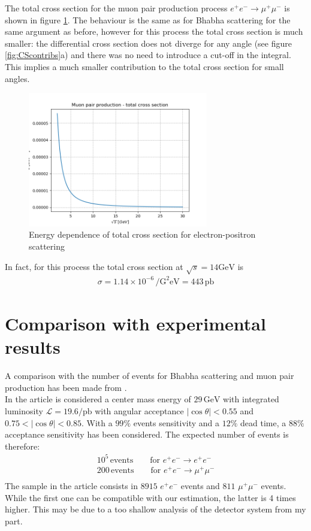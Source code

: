 \documentclass[10pt,a4paper]{article}
\begin{document}
The total cross section for the muon pair production process $e^+e^-\rightarrow\mu^+\mu^-$ is shown in figure \ref{fig:muontotalcrossection}. The behaviour is the same as for Bhabha scattering for the same argument as before, however for this process the total cross section is much smaller: the differential cross section does not diverge for any angle (see figure \ref{fig:CScontribs}a) and there was no need to introduce a cut-off in the integral. This implies a much smaller contribution to the total cross section for small angles.

\begin{figure}[!ht]
\centering
\includegraphics[width=0.7\textwidth]{figures/muontotalCS.png}
\caption{Energy dependence of total cross section for electron-positron scattering}
\label{fig:muontotalcrossection}
\end{figure}

In fact, for this process the total cross section at $\sqrt{s}=14\si{\giga\electronvolt}$ is
\begin{align*}
\sigma  = 1.14\times10^{-6}\,\si{\per\square\giga\electronvolt} = 443\,\si{\pico\barn}
\end{align*}

\section{Comparison with experimental results}
A comparison with the number of events for Bhabha scattering and muon pair production has been made from \cite{29GeV}.\\
In the article is considered a center mass energy of $29\,\si{\giga\electronvolt}$ with integrated luminosity $\mathcal{L}=19.6\si{\per\pico\barn}$ with angular acceptance $|\cos\theta|<0.55$ and $0.75<|\cos\theta|<0.85$. With a $99\si{\percent}$ events sensitivity and a $12\si{\percent}$ dead time, a $88\si{\percent}$ acceptance sensitivity has been considered.
The expected number of events is therefore:
\begin{align*}
10^5\,\text{events}\qquad \text{for	}e^+e^-\rightarrow e^+e^-\\
200\,\text{events}\qquad \text{for	}e^+e^-\rightarrow \mu^+\mu^-\\
\end{align*} 
The sample in the article consists in $8915$ $e^+e^-$ events and $811$ $\mu^+\mu^-$ events. While the first one can be compatible with our estimation, the latter is 4 times higher. This may be due to a too shallow analysis of the detector system from my part.
\end{document}
